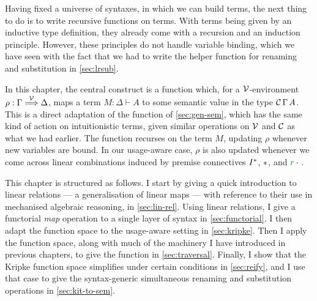 Having fixed a universe of syntaxes, in which we can build terms, the next thing
to do is to write recursive functions on terms.
With terms being given by an inductive  type definition, they
already come with a recursion and an induction principle.
However, these principles do not handle variable binding, which we have seen
with the fact that we had to write the  helper
function for renaming and substitution in \cref{sec:lrsub}.

In this chapter, the central construct is a function 
which, for a $\mathcal V$-environment $\rho : \Gamma \stackrel{\mathcal V}\Longrightarrow \Delta$,
maps a term $M : \Delta \vdash A$ to some semantic value in the type
$\mathcal C\,\Gamma\,A$.
This is a direct adaptation of the  function of
\cref{sec:gen-sem}, which has the same kind of action on intuitionistic terms,
given similar operations on $\mathcal V$ and $\mathcal C$ as what we had earlier.
The  function recurses on the term $M$, updating $\rho$
whenever new variables are bound.
In our usage-aware case, $\rho$ is also updated whenever we come across linear
combinations induced by premise connectives $I^{\mathbin{*}}$, $\mathbin{*}$, and
$\gr r \cdot {}$.

This chapter is structured as follows.
I start by giving a quick introduction to linear relations --- a generalisation
of linear maps --- with reference to their use in mechanised algebraic
reasoning, in \cref{sec:lin-rel}.
Using linear relations, I give a functorial \emph{map} operation to a single
layer of syntax in \cref{sec:functorial}.
I then adapt the  function space to the usage-aware
setting in \cref{sec:kripke}.
Then I apply the  function space, along with much of the
machinery I have introduced in previous chapters, to give the
 function in \cref{sec:traversal}.
Finally, I show that the Kripke function space simplifies under certain
conditions in \cref{sec:reify}, and I use that case to give the syntax-generic
simultaneous renaming and substitution operations in \cref{sec:kit-to-sem}.





